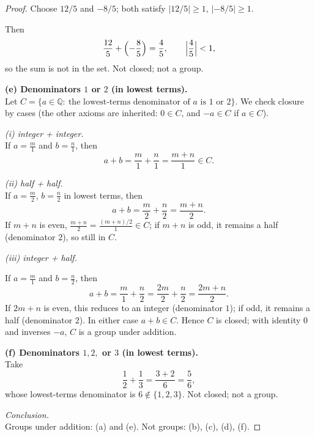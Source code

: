 \documentclass[12pt]{article}
\theoremstyle{definition}
\begin{document}
\begin{proof}
\noindent
Choose $12/5$ and $-8/5$; both satisfy $|12/5|\ge 1$, $|{-8/5}|\ge 1$.

\noindent
Then
\[
\frac{12}{5}+\Bigl(-\frac{8}{5}\Bigr)=\frac{4}{5},\qquad \Bigl|\frac{4}{5}\Bigr|<1,
\]
so the sum is not in the set. Not closed; not a group.

\dotfill

\noindent\textbf{(e) Denominators $1$ or $2$ (in lowest terms).}\\

\noindent
Let $C=\{a\in\mathbb{Q}\!:\ \text{the lowest-terms denominator of $a$ is $1$ or $2$}\}$.
We check closure by cases (the other axioms are inherited: $0\in C$, and $-a\in C$ if $a\in C$).

\noindent\emph{(i) integer + integer.}\\

\noindent
If $a=\frac{m}{1}$ and $b=\frac{n}{1}$, then
\[
a+b=\frac{m}{1}+\frac{n}{1}=\frac{m+n}{1}\in C.
\]

\noindent\emph{(ii) half + half.}\\

\noindent
If $a=\frac{m}{2}$, $b=\frac{n}{2}$ in lowest terms, then
\[
a+b=\frac{m}{2}+\frac{n}{2}=\frac{m+n}{2}.
\]
If $m+n$ is even, $\frac{m+n}{2}=\frac{(m+n)/2}{1}\in C$; if $m+n$ is odd, it remains a half (denominator $2$), so still in $C$.

\noindent\emph{(iii) integer + half.}

\noindent
If $a=\frac{m}{1}$ and $b=\frac{n}{2}$, then
\[
a+b=\frac{m}{1}+\frac{n}{2}=\frac{2m}{2}+\frac{n}{2}=\frac{2m+n}{2}.
\]
If $2m+n$ is even, this reduces to an integer (denominator $1$); if odd, it remains a half (denominator $2$). In either case $a+b\in C$.
Hence $C$ is closed; with identity $0$ and inverses $-a$, $C$ is a group under addition.

\dotfill

\noindent\textbf{(f) Denominators $1,2,$ or $3$ (in lowest terms).}\\

\noindent
Take
\[
\frac{1}{2}+\frac{1}{3}=\frac{3+2}{6}=\frac{5}{6},
\]
whose lowest-terms denominator is $6\notin\{1,2,3\}$. Not closed; not a group.

\dotfill

\noindent\emph{Conclusion.}\\

\noindent
Groups under addition: (a) and (e).
Not groups: (b), (c), (d), (f).
\end{proof}
\end{document}

